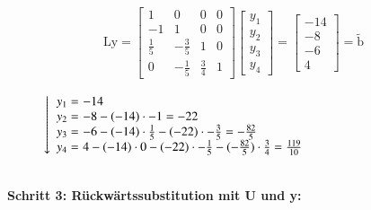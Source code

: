 \documentclass[10pt,a4paper]{article}
\begin{document}
	\begin{figure}[htbp]
		\centering
		\begin{minipage}{0.4\linewidth}
			\begin{align*}
				\text{Ly}=
				\begin{bmatrix}
				1           & 0            & 0           & 0 \\
				-1          & 1            & 0           & 0 \\
				\frac{1}{5} & -\frac{3}{5} & 1           & 0 \\
				0           & -\frac{1}{5} & \frac{3}{4} & 1
				\end{bmatrix}
				\begin{bmatrix}
				y_1 \\
				y_2 \\
				y_3 \\
				y_4
				\end{bmatrix}
				= \begin{bmatrix} -14 \\ -8 \\ -6  \\ 4 \end{bmatrix}
				= \tilde{\text{b}}
			\end{align*}
		\end{minipage}
		\begin{minipage}{0.4\linewidth}
			\vspace{0.25cm}
			$\left\downarrow
			\begin{array}{rl}
				y_1=&\!\!\!\! -14 \\
				y_2=&\!\!\!\!  -8-(-14)\cdot -1 = -22 \\
				y_3=&\!\!\!\!  -6-(-14)\cdot \frac{1}{5}-(-22)\cdot-\frac{3}{5} = - \frac{82}{5}\\
				y_4=&\!\!\!\!  4-(-14)\cdot0-(-22)\cdot-\frac{1}{5}-(-\frac{82}{5})\cdot\frac{3}{4}   = \frac{119}{10}
			\end{array}
			\right.$
		\end{minipage}
	\end{figure}\\
	\textbf{Schritt 3: Rückwärtssubstitution mit U und y:}
\end{document}
